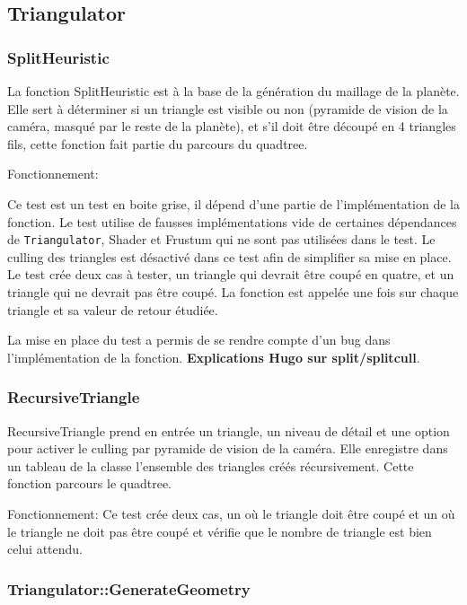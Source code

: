 \subsection{Triangulator}\label{triangulator}

\subsubsection{SplitHeuristic}\label{splitheuristic}

La fonction SplitHeuristic est à la base de la génération du maillage de
la planète. Elle sert à déterminer si un triangle est visible ou non
(pyramide de vision de la caméra, masqué par le reste de la planète), et
s'il doit être découpé en 4 triangles fils, cette fonction fait partie
du parcours du quadtree.

Fonctionnement:

Ce test est un test en boite grise, il dépend d'une partie de
l'implémentation de la fonction. Le test utilise de fausses
implémentations vide de certaines dépendances de \texttt{Triangulator},
Shader et Frustum qui ne sont pas utilisées dans le test. Le culling des
triangles est désactivé dans ce test afin de simplifier sa mise en
place. Le test crée deux cas à tester, un triangle qui devrait être
coupé en quatre, et un triangle qui ne devrait pas être coupé. La
fonction est appelée une fois sur chaque triangle et sa valeur de retour
étudiée.

La mise en place du test a permis de se rendre compte d'un bug dans
l'implémentation de la fonction. \textbf{Explications Hugo sur
split/splitcull}.

\subsubsection{RecursiveTriangle}\label{recursivetriangle}

RecursiveTriangle prend en entrée un triangle, un niveau de détail et
une option pour activer le culling par pyramide de vision de la caméra.
Elle enregistre dans un tableau de la classe l'ensemble des triangles
créés récursivement. Cette fonction parcours le quadtree.

Fonctionnement: Ce test crée deux cas, un où le triangle doit être coupé
et un où le triangle ne doit pas être coupé et vérifie que le nombre de
triangle est bien celui attendu.

\subsubsection{Triangulator::GenerateGeometry}\label{triangulatorgenerategeometry}

